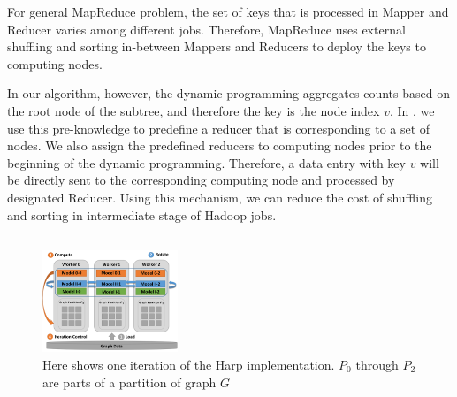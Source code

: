 For general MapReduce problem, the set of keys that is processed in Mapper and
Reducer varies among different jobs. Therefore, MapReduce uses external
shuffling and sorting in-between Mappers and Reducers to deploy the keys to
computing nodes. 

In our algorithm, however, the dynamic programming aggregates counts based on
the root node of the subtree, and therefore the key is the node index $v$.  In
\ensahad{}, we use this pre-knowledge to predefine a reducer that is
corresponding to a set of nodes. We also assign the predefined reducers to
computing nodes prior to the beginning of the dynamic programming. Therefore, a
data entry with key $v$ will be directly sent to the corresponding computing
node and processed by designated Reducer. Using this mechanism, we can reduce
the cost of shuffling and sorting in intermediate stage of Hadoop jobs.

\subsection{\harpsahad{}}
\label{sec:harp-implementation}

\begin{figure}[htbp]
\centerline{\includegraphics[width=0.36\textwidth]{plots/harp-imp.eps}}
\caption{Here shows one iteration of the Harp implementation. $P_0$ through
$P_2$ are parts of a partition of graph $G$}
\label{fig:harp-imp}
\end{figure}


